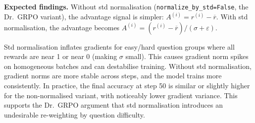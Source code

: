 \documentclass[11pt]{article}
\begin{document}
\textbf{Expected findings.} Without std normalisation (\texttt{normalize\_by\_std=False},
the Dr.\ GRPO variant), the advantage signal is simpler:
$A^{(i)} = r^{(i)} - \overline{r}$. With std normalisation, the advantage becomes
$A^{(i)} = (r^{(i)} - \overline{r}) / (\sigma + \varepsilon)$.

Std normalisation inflates gradients for easy/hard question groups where all rewards
are near 1 or near 0 (making $\sigma$ small). This causes gradient norm spikes on
homogeneous batches and can destabilise training. Without std normalisation, gradient
norms are more stable across steps, and the model trains more consistently. In practice,
the final accuracy at step 50 is similar or slightly higher for the non-normalised
variant, with noticeably lower gradient variance. This supports the Dr.\ GRPO argument
that std normalisation introduces an undesirable re-weighting by question difficulty.
\end{document}
